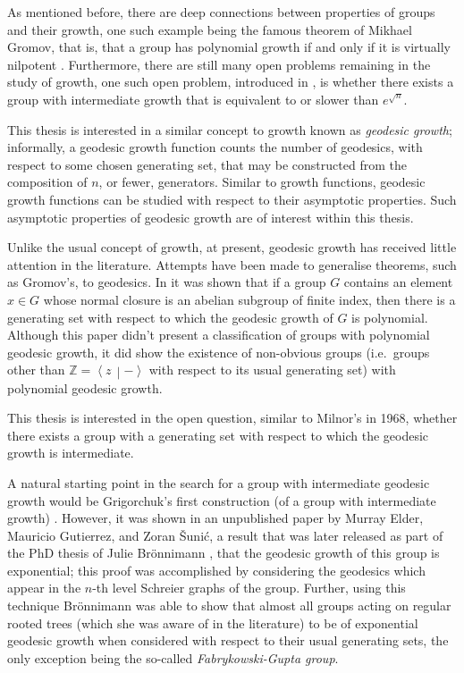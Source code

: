 As mentioned before, there are deep connections between properties of groups and their growth, one such example being the famous theorem of Mikhael Gromov, that is, that a group has polynomial growth if and only if it is virtually nilpotent \cite{GromovTheorem}.
Furthermore, there are still many open problems remaining in the study of growth, one such open problem, introduced in \cite{GrigGap}, is whether there exists a group with intermediate growth that is equivalent to or slower than $e^{\sqrt{n}}$.

This thesis is interested in a similar concept to growth known as \emph{geodesic growth}; informally, a geodesic growth function counts the number of geodesics, with respect to some chosen generating set, that may be constructed from the composition of $n$, or fewer, generators.
Similar to growth functions, geodesic growth functions can be studied with respect to their asymptotic properties.
Such asymptotic properties of geodesic growth are of interest within this thesis.

Unlike the usual concept of growth, at present, geodesic growth has received little attention in the literature.
Attempts have been made to generalise theorems, such as Gromov's, to geodesics. In \cite{OnGroupsPolynomial} it was shown that if a group $G$ contains an element $x \in G$ whose normal closure is an abelian subgroup of finite index, then there is a generating set with respect to which the geodesic growth of $G$ is polynomial.
Although this paper didn't present a classification of groups with polynomial geodesic growth, it did show the existence of non-obvious groups (i.e.\ groups other than $\mathbb{Z} = \left\langle z \, \middle\vert - \right\rangle$ with respect to its usual generating set) with polynomial geodesic growth.

This thesis is interested in the open question, similar to Milnor's in 1968, whether there exists a group with a generating set with respect to which the geodesic growth is intermediate.

A natural starting point in the search for a group with intermediate geodesic growth would be Grigorchuk's first construction (of a group with intermediate growth) \cite{GrigFirst}.
However, it was shown in an unpublished paper by Murray Elder, Mauricio Gutierrez, and Zoran \v{S}uni\'c, a result that was later released as part of the PhD thesis of Julie Br\"onnimann \cite{Julie2016GeodesicGrowth}, that the geodesic growth of this group is exponential; this proof was accomplished by considering the geodesics which appear in the $n$-th level Schreier graphs of the group.
Further, using this technique Br\"onnimann was able to show that almost all groups acting on regular rooted trees (which she was aware of in the literature) to be of exponential geodesic growth when considered with respect to their usual generating sets, the only exception being the so-called \emph{Fabrykowski-Gupta group}.

